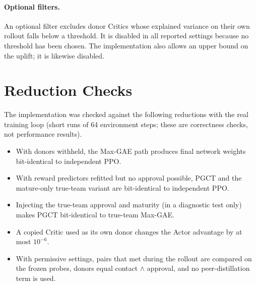 \documentclass[10pt]{article}
\begin{document}
\paragraph{Optional filters.} An optional filter excludes donor Critics whose explained variance on their own rollout falls below a threshold. It is disabled in all reported settings because no threshold has been chosen. The implementation also allows an upper bound on the uplift; it is likewise disabled.

\section{Reduction Checks}
The implementation was checked against the following reductions with the real training loop (short runs of 64 environment steps; these are correctness checks, not performance results).
\begin{itemize}
\item With donors withheld, the Max-GAE path produces final network weights bit-identical to independent PPO.
\item With reward predictors refitted but no approval possible, PGCT and the mature-only true-team variant are bit-identical to independent PPO.
\item Injecting the true-team approval and maturity (in a diagnostic test only) makes PGCT bit-identical to true-team Max-GAE.
\item A copied Critic used as its own donor changes the Actor advantage by at most $10^{-6}$.
\item With permissive settings, pairs that met during the rollout are compared on the frozen probes, donors equal contact $\wedge$ approval, and no peer-distillation term is used.
\end{itemize}
\end{document}
